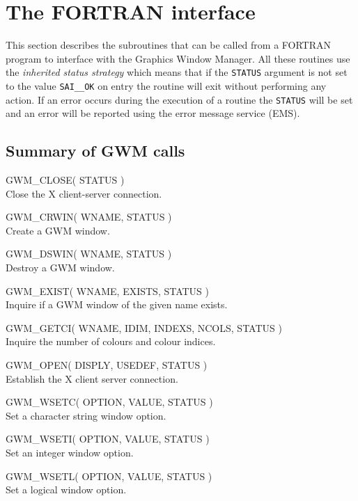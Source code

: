 \section{The FORTRAN interface}

This section describes the subroutines that can be called from a FORTRAN
program to interface with the Graphics Window Manager. All these routines
use the {\em inherited status strategy} which means that if the {\tt STATUS}
argument is not set to the value {\tt SAI\_\_OK} on entry the routine will
exit without performing any action. If an error occurs during the execution
of a routine the {\tt STATUS} will be set and an error will be reported
using the error message service (EMS).

\subsection{Summary of GWM calls}

\newenvironment{routinelist}{\begin{list}{}{\setlength{\leftmargin}{2cm}
                             \setlength{\parsep}{\smallskipamount}}}{\end{list}}
\newcommand{\routine}[1]{\item\hspace{-1cm}#1\\}

\begin{routinelist}
\routine{GWM\_CLOSE( STATUS )}
   Close the X client-server connection.
\routine{GWM\_CRWIN( WNAME, STATUS )}
   Create a GWM window.
\routine{GWM\_DSWIN( WNAME, STATUS )}
   Destroy a GWM window.
\routine{GWM\_EXIST( WNAME, EXISTS, STATUS )}
   Inquire if a GWM window of the given name exists.
\routine{GWM\_GETCI( WNAME, IDIM, INDEXS, NCOLS, STATUS )}
   Inquire the number of colours and colour indices.
\routine{GWM\_OPEN( DISPLY, USEDEF, STATUS )}
   Establish the X client server connection.
\routine{GWM\_WSETC( OPTION, VALUE, STATUS )}
   Set a character string window option.
\routine{GWM\_WSETI( OPTION, VALUE, STATUS )}
   Set an integer window option.
\routine{GWM\_WSETL( OPTION, VALUE, STATUS )}
   Set a logical window option.
\end{routinelist}

